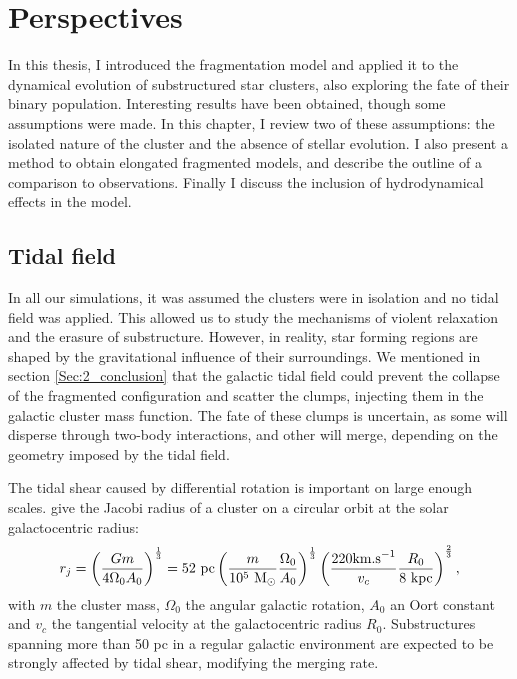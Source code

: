 \chapter{Perspectives}

In this thesis, I introduced the \HubLem fragmentation model and applied it to the dynamical evolution of substructured star clusters, also exploring the fate of their binary population. Interesting results have been obtained, though some assumptions were made. In this chapter, I review two of these assumptions:  the isolated nature of the cluster and the absence of stellar evolution.  I also present a method to obtain elongated fragmented models, and describe the outline of a comparison to observations. Finally I discuss the inclusion of hydrodynamical effects in the model.


\minitoc



\section{Tidal field}

In all our simulations, it was assumed the clusters were in isolation and no tidal field was applied. This allowed us to study the mechanisms of violent relaxation and the erasure of substructure. However, in reality, star forming regions are shaped by the gravitational influence of their surroundings. We mentioned in section \ref{Sec:2_conclusion} that the galactic tidal field could prevent the collapse of the \HubLem fragmented configuration and scatter the clumps, injecting them in the galactic cluster mass function. The fate of these clumps is uncertain, as some will disperse through two-body interactions, and other will merge, depending on the geometry imposed by the tidal field. 


The tidal shear caused by differential rotation is important on large enough scales. \cite{BT} give the Jacobi radius of a cluster on a circular orbit at the solar galactocentric radius:
\begin{equation}
r_j = \left( \frac{G m}{4 \Omega_0 A_0} \right)^\frac{1}{3} = 52~{\textrm{pc}} \left( \frac{m}{10^5~{\textrm{M}_\odot}} \frac{\Omega_0}{A_0} \right)^\frac{1}{3} \left( \frac{220 \textrm{km.s}^{-1}}{v_c} \frac{R_0}{8~\textrm{kpc}} \right)^\frac{2}{3},
\end{equation}
with $m$ the cluster mass, $\Omega_0$ the angular galactic rotation, $A_0$ an Oort constant and $v_c$ the tangential velocity at the galactocentric radius $R_0$. Substructures spanning more than 50 pc in a regular galactic environment are expected to be strongly affected by tidal shear, modifying the merging rate.

